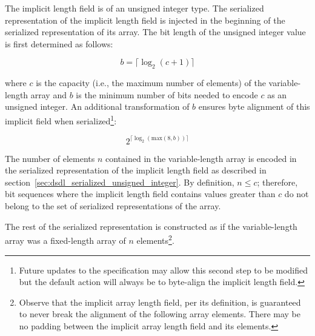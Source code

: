 The implicit length field is of an unsigned integer type.
The serialized representation of the implicit length field
is injected in the beginning of the serialized representation of its array.
The bit length of the unsigned integer value is first determined as follows:

$$b=\lceil{}\log_2 (c + 1)\rceil{}$$

where $c$ is the capacity (i.e., the maximum number of elements) of the variable-length array and
$b$ is the minimum number of bits needed to encode $c$ as an unsigned integer. An additional transformation
of $b$ ensures byte alignment of this implicit field when serialized\footnote{Future updates to the specification
may allow this second step to be modified but the default action will always be to byte-align the implicit
length field.}:

$$2^{\lceil{}\log_2 (\text{max}(8, b))\rceil{}}$$

The number of elements $n$ contained in the variable-length array is encoded
in the serialized representation of the implicit length field
as described in section~\ref{sec:dsdl_serialized_unsigned_integer}.
By definition, $n \leq c$; therefore, bit sequences where the implicit length field contains values
greater than $c$ do not belong to the set of serialized representations of the array.

The rest of the serialized representation is constructed as if the variable-length array was
a fixed-length array of $n$ elements\footnote{%
    Observe that the implicit array length field, per its definition,
    is guaranteed to never break the alignment of the following array elements.
    There may be no padding between the implicit array length field and its elements.
}.

